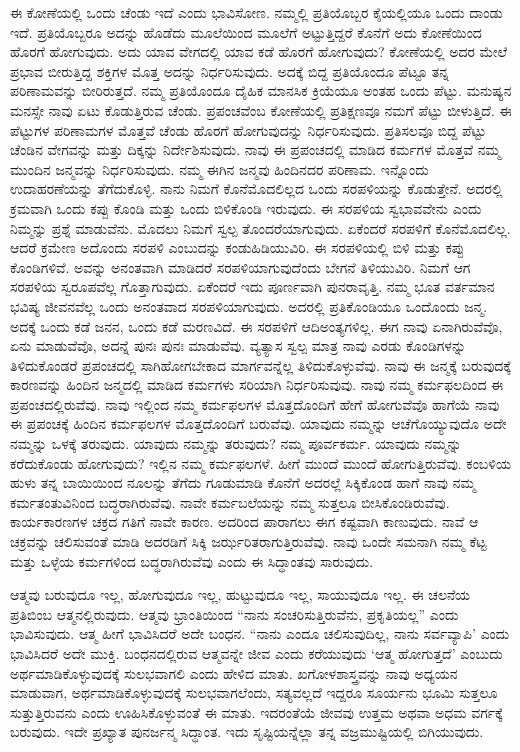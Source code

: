 ಈ ಕೋಣೆಯಲ್ಲಿ ಒಂದು ಚೆಂಡು ಇದೆ ಎಂದು ಭಾವಿಸೋಣ. ನಮ್ಮಲ್ಲಿ ಪ್ರತಿಯೊಬ್ಬರ ಕೈಯಲ್ಲಿಯೂ ಒಂದು ದಾಂಡು ಇದೆ. ಪ್ರತಿಯೊಬ್ಬರೂ ಅದನ್ನು ಹೊಡೆದು ಮೂಲೆಯಿಂದ ಮೂಲೆಗೆ ಅಟ್ಟುತ್ತಿದ್ದರೆ ಕೊನೆಗೆ ಅದು ಕೋಣೆಯಿಂದ ಹೊರಗೆ ಹೋಗುವುದು. ಅದು ಯಾವ ವೇಗದಲ್ಲಿ ಯಾವ ಕಡೆ ಹೊರಗೆ ಹೋಗುವುದು? ಕೋಣೆಯಲ್ಲಿ ಅದರ ಮೇಲೆ ಪ್ರಭಾವ ಬೀರುತ್ತಿದ್ದ ಶಕ್ತಿಗಳ ಮೊತ್ತ ಅದನ್ನು ನಿರ್ಧರಿಸುವುದು. ಅದಕ್ಕೆ ಬಿದ್ದ ಪ್ರತಿಯೊಂದೂ ಪೆಟ್ಟೂ ತನ್ನ ಪರಿಣಾಮವನ್ನು ಬೀರಿರುತ್ತದೆ. ನಮ್ಮ ಪ್ರತಿಯೊಂದೂ ದೈಹಿಕ ಮಾನಸಿಕ ಕ್ರಿಯೆಯೂ ಅಂತಹ ಒಂದು ಪೆಟ್ಟು. ಮನುಷ್ಯನ ಮನಸ್ಸೇ ನಾವು ಏಟು ಕೊಡುತ್ತಿರುವ ಚೆಂಡು. ಪ್ರಪಂಚವೆಂಬ ಕೋಣೆಯಲ್ಲಿ ಪ್ರತಿಕ್ಷಣವೂ ನಮಗೆ ಪೆಟ್ಟು ಬೀಳುತ್ತಿದೆ. ಈ ಪೆಟ್ಟುಗಳ ಪರಿಣಾಮಗಳ ಮೊತ್ತವೆ ಚೆಂಡು ಹೊರಗೆ ಹೋಗುವುದನ್ನು ನಿರ್ಧರಿಸುವುದು. ಪ್ರತಿಸಲವೂ ಬಿದ್ದ ಪೆಟ್ಟು ಚೆಂಡಿನ ವೇಗವನ್ನು ಮತ್ತು ದಿಕ್ಕನ್ನು ನಿರ್ದೇಶಿಸುವುದು. ನಾವು ಈ ಪ್ರಪಂಚದಲ್ಲಿ ಮಾಡಿದ ಕರ್ಮಗಳ ಮೊತ್ತವೆ ನಮ್ಮ ಮುಂದಿನ ಜನ್ಮವನ್ನು ನಿರ್ಧರಿಸುವುದು. ನಮ್ಮ ಈಗಿನ ಜನ್ಮವು ಹಿಂದಿನದರ ಪರಿಣಾಮ. ಇನ್ನೊಂದು ಉದಾಹರಣೆಯನ್ನು ತೆಗೆದುಕೊಳ್ಳಿ. ನಾನು ನಿಮಗೆ ಕೊನೆಮೊದಲಿಲ್ಲದ ಒಂದು ಸರಪಳಿಯನ್ನು ಕೊಡುತ್ತೇನೆ. ಅದರಲ್ಲಿ ಕ್ರಮವಾಗಿ ಒಂದು ಕಪ್ಪು ಕೊಂಡಿ ಮತ್ತು ಒಂದು ಬಿಳಿಕೊಂಡಿ ಇರುವುದು. ಈ ಸರಪಳಿಯ ಸ್ವಭಾವವೇನು ಎಂದು ನಿಮ್ಮನ್ನು ಪ್ರಶ್ನೆ ಮಾಡುವೆನು. ಮೊದಲು ನಿಮಗೆ ಸ್ವಲ್ಪ ತೊಂದರೆಯಾಗುವುದು. ಏಕೆಂದರೆ ಸರಪಳಿಗೆ ಕೊನೆಮೊದಲಿಲ್ಲ. ಆದರೆ ಕ್ರಮೇಣ ಅದೊಂದು ಸರಪಳಿ ಎಂಬುದನ್ನು ಕಂಡುಹಿಡಿಯುವಿರಿ. ಈ ಸರಪಳಿಯಲ್ಲಿ ಬಿಳಿ ಮತ್ತು ಕಪ್ಪು ಕೊಂಡಿಗಳಿವೆ. ಅವನ್ನು ಅನಂತವಾಗಿ ಮಾಡಿದರೆ ಸರಪಳಿಯಾಗುವುದೆಂದು ಬೇಗನೆ ತಿಳಿಯುವಿರಿ. ನಿಮಗೆ ಆಗ ಸರಪಳಿಯ ಸ್ವರೂಪವೆಲ್ಲ ಗೊತ್ತಾಗುವುದು. ಏಕೆಂದರೆ ಇದು ಪೂರ್ಣವಾಗಿ ಪುನರಾವೃತ್ತಿ. ನಮ್ಮ ಭೂತ ವರ್ತಮಾನ ಭವಿಷ್ಯ ಜೀವನವೆಲ್ಲ ಒಂದು ಅನಂತವಾದ ಸರಪಳಿಯಾಗುವುದು. ಅದರಲ್ಲಿ ಪ್ರತಿಕೊಂಡಿಯೂ ಒಂದೊಂದು ಜನ್ಮ. ಅದಕ್ಕೆ ಒಂದು ಕಡೆ ಜನನ, ಒಂದು ಕಡೆ ಮರಣವಿದೆ. ಈ ಸರಪಳಿಗೆ ಆದಿಅಂತ್ಯಗಳಿಲ್ಲ. ಈಗ ನಾವು ಏನಾಗಿರುವೆವೊ, ಏನು ಮಾಡುವೆವೊ, ಅದನ್ನೆ ಪುನಃ ಪುನಃ ಮಾಡುವೆವು. ವ್ಯತ್ಯಾಸ ಸ್ವಲ್ಪ ಮಾತ್ರ ನಾವು ಎರಡು ಕೊಂಡಿಗಳನ್ನು ತಿಳಿದುಕೊಂಡರೆ ಪ್ರಪಂಚದಲ್ಲಿ ಸಾಗಿಹೋಗಬೇಕಾದ ಮಾರ್ಗವನ್ನೆಲ್ಲ ತಿಳಿದುಕೊಳ್ಳುವೆವು. ನಾವು ಈ ಜನ್ಮಕ್ಕೆ ಬರುವುದಕ್ಕೆ ಕಾರಣವನ್ನು ಹಿಂದಿನ ಜನ್ಮದಲ್ಲಿ ಮಾಡಿದ ಕರ್ಮಗಳು ಸರಿಯಾಗಿ ನಿರ್ಧರಿಸುವುವು. ನಾವು ನಮ್ಮ ಕರ್ಮಫಲದಿಂದ ಈ ಪ್ರಪಂಚದಲ್ಲಿರುವೆವು. ನಾವು ಇಲ್ಲಿಂದ ನಮ್ಮ ಕರ್ಮಫಲಗಳ ಮೊತ್ತದೊಂದಿಗೆ ಹೇಗೆ ಹೋಗುವೆವೊ ಹಾಗೆಯೆ ನಾವು ಈ ಪ್ರಪಂಚಕ್ಕೆ ಹಿಂದಿನ ಕರ್ಮಫಲಗಳ ಮೊತ್ತದೊಂದಿಗೆ ಬರುವೆವು. ಯಾವುದು ನಮ್ಮನ್ನು ಆಚೆಗೊಯ್ಯುವುದೊ ಅದೇ ನಮ್ಮನ್ನು ಒಳಕ್ಕೆ ತರುವುದು. ಯಾವುದು ನಮ್ಮನ್ನು ತರುವುದು? ನಮ್ಮ ಪೂರ್ವಕರ್ಮ. ಯಾವುದು ನಮ್ಮನ್ನು ಕರೆದುಕೊಂಡು ಹೋಗುವುದು? ಇಲ್ಲಿನ ನಮ್ಮ ಕರ್ಮಫಲಗಳೆ. ಹೀಗೆ ಮುಂದೆ ಮುಂದೆ ಹೋಗುತ್ತಿರುವೆವು. ಕಂಬಳಿಯ ಹುಳು ತನ್ನ ಬಾಯಿಯಿಂದ ನೂಲನ್ನು ತೆಗೆದು ಗೂಡುಮಾಡಿ ಕೊನೆಗೆ ಅದರಲ್ಲೆ ಸಿಕ್ಕಿಕೊಂಡ ಹಾಗೆ ನಾವು ನಮ್ಮ ಕರ್ಮತಂತುವಿನಿಂದ ಬದ್ಧರಾಗಿರುವೆವು. ನಾವೇ ಕರ್ಮಬಲೆಯನ್ನು ನಮ್ಮ ಸುತ್ತಲೂ ಬೀಸಿಕೊಂಡಿರುವೆವು. ಕಾರ್ಯಕಾರಣಗಳ ಚಕ್ರದ ಗತಿಗೆ ನಾವೇ ಕಾರಣ. ಅದರಿಂದ ಪಾರಾಗಲು ಈಗ ಕಷ್ಟವಾಗಿ ಕಾಣುವುದು. ನಾವೆ ಆ ಚಕ್ರವನ್ನು ಚಲಿಸುವಂತೆ ಮಾಡಿ ಅದರಡಿಗೆ ಸಿಕ್ಕಿ ಜರ್ಝರಿತರಾಗುತ್ತಿರುವೆವು. ನಾವು ಒಂದೇ ಸಮನಾಗಿ ನಮ್ಮ ಕೆಟ್ಟ ಮತ್ತು ಒಳ್ಳೆಯ ಕರ್ಮಗಳಿಂದ ಬದ್ಧರಾಗಿರುವೆವು ಎಂದು ಈ ಸಿದ್ಧಾಂತವು ಸಾರುವುದು.

ಆತ್ಮವು ಬರುವುದೂ ಇಲ್ಲ, ಹೋಗುವುದೂ ಇಲ್ಲ, ಹುಟ್ಟುವುದೂ ಇಲ್ಲ, ಸಾಯುವುದೂ ಇಲ್ಲ. ಈ ಚಲನೆಯ ಪ್ರತಿಬಿಂಬ ಆತ್ಮನಲ್ಲಿರುವುದು. ಆತ್ಮವು ಭ್ರಾಂತಿಯಿಂದ “ನಾನು ಸಂಚರಿಸುತ್ತಿರುವೆನು, ಪ್ರಕೃತಿಯಲ್ಲ” ಎಂದು ಭಾವಿಸುವುದು. ಆತ್ಮ ಹೀಗೆ ಭಾವಿಸಿದರೆ ಅದೇ ಬಂಧನ. “ನಾನು ಎಂದೂ ಚಲಿಸುವುದಿಲ್ಲ, ನಾನು ಸರ್ವವ್ಯಾಪಿ’ ಎಂದು ಭಾವಿಸಿದರೆ ಅದೇ ಮುಕ್ತಿ. ಬಂಧನದಲ್ಲಿರುವ ಆತ್ಮವನ್ನೇ ಜೀವ ಎಂದು ಕರೆಯುವುದು ‘ಆತ್ಮ ಹೋಗುತ್ತದೆ’ ಎಂಬುದು ಅರ್ಥಮಾಡಿಕೊಳ್ಳುವುದಕ್ಕೆ ಸುಲಭವಾಗಲಿ ಎಂದು ಹೇಳಿದ ಮಾತು. ಖಗೋಳಶಾಸ್ತ್ರವನ್ನು ನಾವು ಅಧ್ಯಯನ ಮಾಡುವಾಗ, ಅರ್ಥಮಾಡಿಕೊಳ್ಳುವುದಕ್ಕೆ ಸುಲಭವಾಗಲೆಂದು, ಸತ್ಯವಲ್ಲದೆ ಇದ್ದರೂ ಸೂರ್ಯನು ಭೂಮಿ ಸುತ್ತಲೂ ಸುತ್ತುತ್ತಿರುವನು ಎಂದು ಊಹಿಸಿಕೊಳ್ಳುವಂತೆ ಈ ಮಾತು. ಇದರಂತೆಯೆ ಜೀವವು ಉತ್ತಮ ಅಥವಾ ಅಧಮ ವರ್ಗಕ್ಕೆ ಬರುವುದು. ಇದೇ ಪ್ರಖ್ಯಾತ ಪುನರ್ಜನ್ಮ ಸಿದ್ಧಾಂತ. ಇದು ಸೃಷ್ಟಿಯನ್ನೆಲ್ಲಾ ತನ್ನ ವಜ್ರಮುಷ್ಟಿಯಲ್ಲಿ ಬಿಗಿಯುವುದು.

